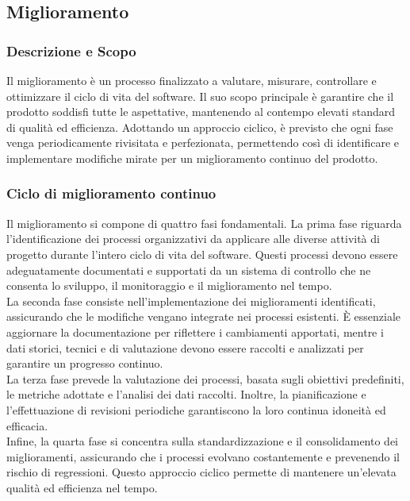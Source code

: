 \documentclass[10pt]{article}
\begin{document}
\begin{justify}
    \subsection{Miglioramento}
    \label{miglioramento}
    \subsubsection{Descrizione e Scopo}
    Il miglioramento è un processo finalizzato a valutare, misurare, controllare e ottimizzare il ciclo di vita del software. Il suo scopo principale è garantire che il prodotto soddisfi tutte le aspettative, mantenendo al contempo elevati standard di qualità ed efficienza.
    Adottando un approccio ciclico, è previsto che ogni fase venga periodicamente rivisitata e perfezionata, permettendo così di identificare e implementare modifiche mirate per un miglioramento continuo del prodotto.\\ 

    \subsubsection{Ciclo di miglioramento continuo}
    Il miglioramento si compone di quattro fasi fondamentali. La prima fase riguarda l'identificazione dei processi organizzativi da applicare alle diverse attività di progetto durante l'intero ciclo di vita del software. Questi processi devono essere adeguatamente documentati e supportati da un sistema di controllo che ne consenta lo sviluppo, il monitoraggio e il miglioramento nel tempo.\\
    La seconda fase consiste nell'implementazione dei miglioramenti identificati, assicurando che le modifiche vengano integrate nei processi esistenti. È essenziale aggiornare la documentazione per riflettere i cambiamenti apportati, mentre i dati storici, tecnici e di valutazione devono essere raccolti e analizzati per garantire un progresso continuo.\\
    La terza fase prevede la valutazione dei processi, basata sugli obiettivi predefiniti, le metriche adottate e l'analisi dei dati raccolti. Inoltre, la pianificazione e l'effettuazione di revisioni periodiche garantiscono la loro continua idoneità ed efficacia.\\
    Infine, la quarta fase si concentra sulla standardizzazione e il consolidamento dei miglioramenti, assicurando che i processi evolvano costantemente e prevenendo il rischio di regressioni. Questo approccio ciclico permette di mantenere un'elevata qualità ed efficienza nel tempo.


\end{justify}
\end{document}
